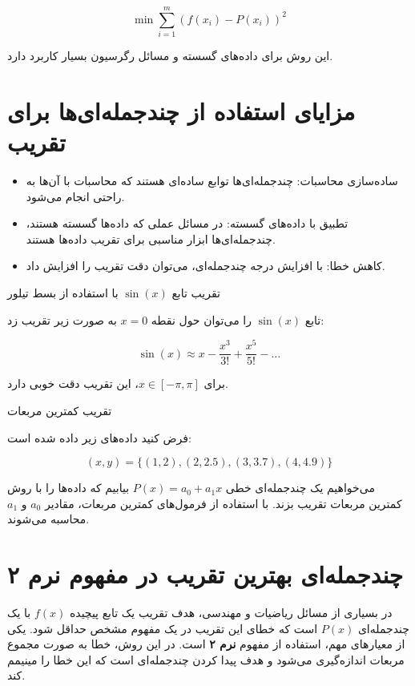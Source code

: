 \[
\min \sum_{i=1}^m \left(f(x_i) - P(x_i)\right)^2
\]

این روش برای داده‌های گسسته و مسائل رگرسیون بسیار کاربرد دارد.
\section{مزایای استفاده از چندجمله‌ای‌ها برای تقریب}

\begin{itemize}
	\item ساده‌سازی محاسبات: چندجمله‌ای‌ها توابع ساده‌ای هستند که محاسبات با آن‌ها به راحتی انجام می‌شود.
	\item تطبیق با داده‌های گسسته: در مسائل عملی که داده‌ها گسسته هستند، چندجمله‌ای‌ها ابزار مناسبی برای تقریب داده‌ها هستند.
	\item کاهش خطا: با افزایش درجه چندجمله‌ای، می‌توان دقت تقریب را افزایش داد.
\end{itemize}

\begin{example}
	تقریب تابع \(\sin(x)\) با استفاده از بسط تیلور
\end{example}

\begin{solution}
	تابع \(\sin(x)\) را می‌توان حول نقطه \(x=0\) به صورت زیر تقریب زد:
	
	\[
	\sin(x) \approx x - \frac{x^3}{3!} + \frac{x^5}{5!} - \dots
	\]
	
	برای \(x \in [-\pi, \pi]\)، این تقریب دقت خوبی دارد.
\end{solution}


\begin{exercise}
	تقریب کمترین مربعات
	
	فرض کنید داده‌های زیر داده شده است:
	
	\[
	(x, y) = \{(1, 2), (2, 2.5), (3, 3.7), (4, 4.9)\}
	\]
	
	می‌خواهیم یک چندجمله‌ای خطی \(P(x) = a_0 + a_1x\) بیابیم که داده‌ها را با روش کمترین مربعات تقریب بزند. با استفاده از فرمول‌های کمترین مربعات، مقادیر \(a_0\) و \(a_1\) محاسبه می‌شوند.
	
\end{exercise}
\section{چندجمله‌ای بهترین تقریب در مفهوم نرم ۲}

در بسیاری از مسائل ریاضیات و مهندسی، هدف تقریب یک تابع پیچیده \(f(x)\) با یک چندجمله‌ای \(P(x)\) است که خطای این تقریب در یک مفهوم مشخص حداقل شود. یکی از معیارهای مهم، استفاده از مفهوم \textbf{نرم ۲} است. در این روش، خطا به صورت مجموع مربعات اندازه‌گیری می‌شود و هدف پیدا کردن چندجمله‌ای است که این خطا را مینیمم کند.

